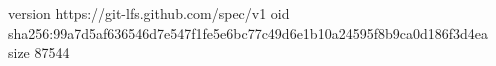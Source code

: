 version https://git-lfs.github.com/spec/v1
oid sha256:99a7d5af636546d7e547f1fe5e6bc77c49d6e1b10a24595f8b9ca0d186f3d4ea
size 87544
